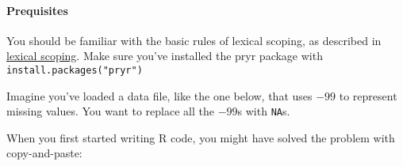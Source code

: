 \paragraph{Prequisites}

You should be familiar with the basic rules of lexical scoping, as
described in \hyperref[lexical-scoping]{lexical scoping}. Make sure
you've installed the pryr package with \texttt{install.packages("pryr")}


Imagine you've loaded a data file, like the one below, that uses $-99$
to represent missing values. You want to replace all the $-99$s with
\texttt{NA}s.

\begin{Shaded}
\begin{Highlighting}[]
\NormalTok{(}\NormalTok{)}
\StringTok{ }\NormalTok{(}\NormalTok{(}\NormalTok{, }\NormalTok{(}\NormalTok{(}\NormalTok{:}\NormalTok{, -}\NormalTok{), }\NormalTok{, } \NormalTok{)))}
\StringTok{ }\NormalTok{letters[}\NormalTok{:}\NormalTok{]}
\end{Highlighting}
\end{Shaded}

When you first started writing R code, you might have solved the problem
with copy-and-paste:

\begin{Shaded}
\begin{Highlighting}[]
\NormalTok{df$a[df$a ==}\StringTok{ }\NormalTok{-}\NormalTok{] <-}\StringTok{ }
\NormalTok{df$b[df$b ==}\StringTok{ }\NormalTok{-}\NormalTok{] <-}\StringTok{ }
\NormalTok{df$c[df$c ==}\StringTok{ }\NormalTok{-}\NormalTok{] <-}\StringTok{ }
\NormalTok{df$d[df$d ==}\StringTok{ }\NormalTok{-}\NormalTok{] <-}\StringTok{ }
\NormalTok{df$e[df$e ==}\StringTok{ }\NormalTok{-}\NormalTok{] <-}\StringTok{ }
\NormalTok{df$f[df$g ==}\StringTok{ }\NormalTok{-}\NormalTok{] <-}\StringTok{ }
\end{Highlighting}
\end{Shaded}

